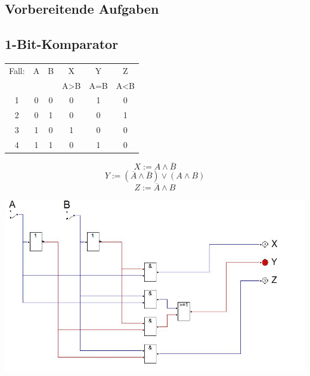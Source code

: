 \documentclass[a4paper, 11pt, fleqn, DIV=10, twoside, BCOR=10mm]{scrreprt}
\begin{document}
 
\AVier
\begin{center}
\chapter{Vorbereitende Aufgaben}
\section{1-Bit-Komparator}
\begin{tabular}{c||c|c||c|c|c}
Fall:&A&B&X&Y&Z\\
 & & &A>B&A=B&A<B\\
\hline
1&0&0&0&1&0\\
2&0&1&0&0&1\\
3&1&0&1&0&0\\
4&1&1&0&1&0\\
\end{tabular}
\begin{equation}
	X:= A \wedge \overline{B}
\end{equation}
\begin{equation}
	Y:= (\overline{A} \wedge \overline{B}) \vee (A \wedge B)
\end{equation}
\begin{equation}
	Z:= \overline{A} \wedge B
\end{equation}
\vspace{10mm}

%
\includegraphics[width=0.9\columnwidth]{DT5Graphics/1_Bit_Komperator.jpg}
%

\end{center}
\end{document}
